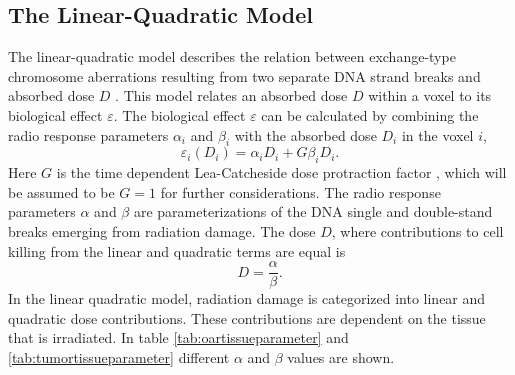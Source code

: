 \subsection{The Linear-Quadratic Model}
The linear-quadratic model describes the relation between exchange-type chromosome aberrations resulting from two separate DNA strand breaks and absorbed dose $D$ \cite{Hall}. This model relates an absorbed dose $D$ within a voxel to its biological effect $\varepsilon$. The biological effect $\varepsilon$ can be calculated by combining  the radio response parameters $\alpha_i$ and $\beta_i$ with the absorbed dose $D_i$ in the voxel $i$,
\begin{equation}
\varepsilon_i(D_i) = \alpha_i D_i + G\beta_i D_i.
\end{equation}
Here $G$ is the time dependent Lea-Catcheside dose protraction factor \cite{pmid9343102}, which will be assumed to be $G=1$ for further considerations. The radio response parameters $\alpha$ and $\beta$ are parameterizations of the DNA single and double-stand breaks emerging from radiation damage. The dose $D$, where contributions to cell killing from the linear and quadratic terms are equal is
\begin{equation}
D = \frac{\alpha}{\beta}.
\end{equation}
In the linear quadratic model, radiation damage is categorized into linear and quadratic dose contributions. These contributions are dependent on the tissue that is irradiated. In table \ref{tab:oartissueparameter} and \ref{tab:tumortissueparameter} different $\alpha$ and $\beta$ values are shown.
